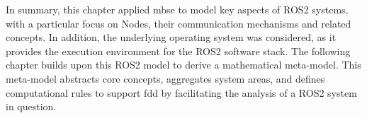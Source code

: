 \enlargethispage{2\baselineskip}
In summary, this chapter applied \acl{mbse} to model key aspects of ROS2 systems, with a particular focus on Nodes, their communication mechanisms and related concepts. In addition, the underlying operating system was considered, as it provides the execution environment for the ROS2 software stack. The following chapter builds upon this ROS2 model to derive a mathematical meta-model. This meta-model abstracts core concepts, aggregates system areas, and defines computational rules to support \acl{fdd} by facilitating the analysis of a ROS2 system in question.